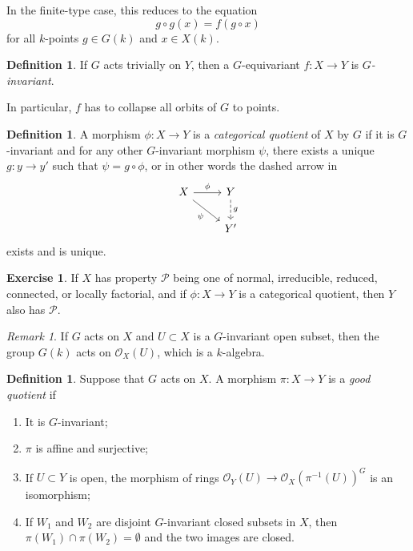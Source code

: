 \documentclass{amsart}
\theoremstyle{definition}
\newtheorem{defn}[thm]{Definition}
\newtheorem{exer}[thm]{Exercise}
\theoremstyle{remark}
\newtheorem{rmk}[thm]{Remark}
\theoremstyle{plain}
\theoremstyle{definition}
\theoremstyle{remark}
\newcommand{\mc}[1]{\mathcal{#1}}
\newcommand{\1}{\mathbf{1}}
\newcommand{\2}{\mathbf{2}}
\newcommand{\3}{\mathbf{3}}
\begin{document}
In the finite-type case, this reduces to the equation
\[ g \circ g(x) = f(g \circ x) \]
for all \(k\)-points \(g \in G(k)\) and \(x \in X(k)\).

\begin{defn}
    If \(G\) acts trivially on \(Y\), then a \(G\)-equivariant \(f \colon X \to Y\) is \textit{\(G\)-invariant}.
\end{defn}

In particular, \(f\) has to collapse all orbits of \(G\) to points.

\begin{defn}
    A morphism \(\phi \colon X \to Y\) is a \textit{categorical quotient} of \(X\) by \(G\) if it is \(G\)-invariant and for any other \(G\)-invariant morphism \(\psi\), there exists a unique \(g \colon y \to y'\) such that \(\psi = g \circ \phi\), or in other words the dashed arrow in
    \begin{equation*}
    \begin{tikzcd}
        X \ar{r}{\phi} \ar[swap]{dr}{\psi} & Y \ar[dashrightarrow]{d}{g} \\
        & Y'
    \end{tikzcd}
    \end{equation*}
    exists and is unique.
\end{defn}

\begin{exer}
    If \(X\) has property \(\mc{P}\) being one of normal, irreducible, reduced, connected, or locally factorial, and if \(\phi \colon X \to Y\) is a categorical quotient, then \(Y\) also has \(\mc{P}\).
\end{exer}

\begin{rmk}
    If \(G\) acts on \(X\) and \(U \subset X\) is a \(G\)-invariant open subset, then the group \(G(k)\) acts on \(\mc{O}_X(U)\), which is a \(k\)-algebra.
\end{rmk}

\begin{defn}
    Suppose that \(G\) acts on \(X\). A morphism \(\pi \colon X \to Y\) is a \textit{good quotient} if
    \begin{enumerate}[(1)]
        \item It is \(G\)-invariant;
        \item \(\pi\) is affine and surjective;
        \item If \(U \subset Y\) is open, the morphism of rings \(\mc{O}_Y(U) \to \mc{O}_X(\pi^{-1}{(U)})^G\) is an isomorphism;
        \item If \(W_1\) and \(W_2\) are disjoint \(G\)-invariant closed subsets in \(X\), then \(\pi(W_1) \cap \pi(W_2) = \emptyset\) and the two images are closed.
    \end{enumerate}
\end{defn}
\end{document}
